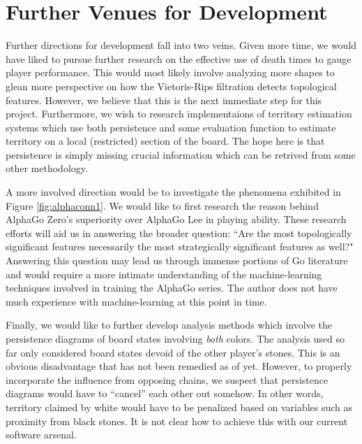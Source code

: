 \documentclass[11pt]{article}
\begin{document}
\section{Further Venues for Development}

Further directions for development fall into two veins. Given more time, we would have liked to pursue further research on the effective use of death times to gauge player performance. This would most likely involve analyzing more shapes to glean more perspective on how the Vietoris-Rips filtration detects topological features. However, we believe that this is the next immediate step for this project. Furthermore, we wish to research implementaions of territory estimation systems which use both persistence and some evaluation function to estimate territory on a local (restricted) section of the board. The hope here is that persistence is simply missing crucial information which can be retrived from some other methodology.

A more involved direction would be to investigate the phenomena exhibited in Figure \ref{fig:alphaconn1}. We would like to first research the reason behind AlphaGo Zero's superiority over AlphaGo Lee in playing ability. These research efforts will aid us in answering the broader question: ``Are the most topologically significant features necessarily the most strategically significant features as well?" Answering this question may lead us through immense portions of Go literature and would require a more intimate understanding of the machine-learning techniques involved in training the AlphaGo series. The author does not have much experience with machine-learning at this point in time.

Finally, we would like to further develop analysis methods which involve the persistence diagrams of board states involving \textit{both} colors. The analysis used so far only considered board states devoid of the other player's stones. This is an obvious disadvantage that has not been remedied as of yet. However, to properly incorporate the influence from opposing chains, we suspect that persistence diagrams would have to ``cancel'' each other out somehow. In other words, territory claimed by white would have to be penalized based on variables such as proximity from black stones. It is not clear how to achieve this with our current software arsenal.
\end{document}

